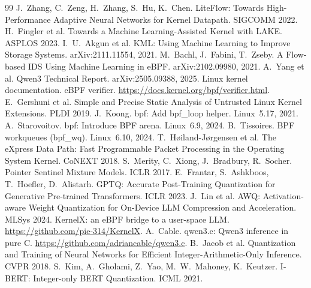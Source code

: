 \documentclass[sigconf,nonacm]{acmart}
\begin{document}
\begin{thebibliography}{99}
 J.~Zhang, C.~Zeng, H.~Zhang, S.~Hu, K.~Chen. LiteFlow:
Towards High-Performance Adaptive Neural Networks for Kernel Datapath.
SIGCOMM 2022.
 H.~Fingler et al. Towards a Machine Learning-Assisted Kernel
with LAKE. ASPLOS 2023.
 I.~U.~Akgun et al. KML: Using Machine Learning to Improve
Storage Systems. arXiv:2111.11554, 2021.
 M.~Bachl, J.~Fabini, T.~Zseby. A Flow-based IDS Using Machine
Learning in eBPF. arXiv:2102.09980, 2021.
 A.~Yang et al. Qwen3 Technical Report. arXiv:2505.09388,
2025.
 Linux kernel documentation. eBPF verifier.
\url{https://docs.kernel.org/bpf/verifier.html}.
 E.~Gershuni et al. Simple and Precise Static Analysis of
Untrusted Linux Kernel Extensions. PLDI 2019.
 J.~Koong. bpf: Add bpf\_loop helper. Linux~5.17, 2021.
 A.~Starovoitov. bpf: Introduce BPF arena. Linux~6.9, 2024.
 B.~Tissoires. BPF workqueues (bpf\_wq). Linux~6.10, 2024.
 T.~H{\o}iland-J{\o}rgensen et al. The eXpress Data Path: Fast
Programmable Packet Processing in the Operating System Kernel. CoNEXT 2018.
 S.~Merity, C.~Xiong, J.~Bradbury, R.~Socher. Pointer
Sentinel Mixture Models. ICLR 2017.
 E.~Frantar, S.~Ashkboos, T.~Hoefler, D.~Alistarh. GPTQ:
Accurate Post-Training Quantization for Generative Pre-trained Transformers.
ICLR 2023.
 J.~Lin et al. AWQ: Activation-aware Weight Quantization for
On-Device LLM Compression and Acceleration. MLSys 2024.
 KernelX: an eBPF bridge to a user-space LLM.
\url{https://github.com/pie-314/KernelX}.
 A.~Cable. qwen3.c: Qwen3 inference in pure C.
\url{https://github.com/adriancable/qwen3.c}.
 B.~Jacob et al. Quantization and Training of Neural Networks
for Efficient Integer-Arithmetic-Only Inference. CVPR 2018.
 S.~Kim, A.~Gholami, Z.~Yao, M.~W.~Mahoney, K.~Keutzer. I-BERT:
Integer-only BERT Quantization. ICML 2021.
\end{thebibliography}
\end{document}
